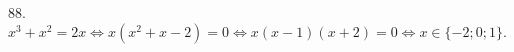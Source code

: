 88. $x^3+x^2=2x\Leftrightarrow x(x^2+x-2)=0\Leftrightarrow x(x-1)(x+2)=0 \Leftrightarrow x\in\{-2;0;1\}.$\\
